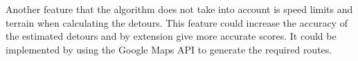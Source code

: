Another feature that the algorithm does not take into account is speed limits and terrain when calculating the detours.
This feature could increase the accuracy of the estimated detours and by extension give more accurate scores.
It could be implemented by using the Google Maps API to generate the required routes.

